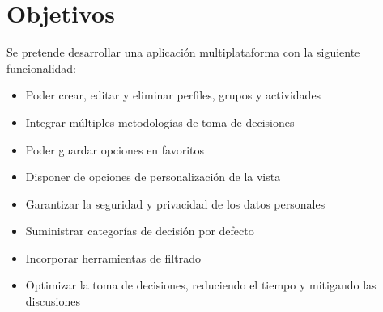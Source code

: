 \section{Objetivos}

Se pretende desarrollar una aplicación multiplataforma con la siguiente funcionalidad:

\begin{itemize}
    \item Poder crear, editar y eliminar perfiles, grupos y actividades
    \item Integrar múltiples metodologías de toma de decisiones
    \item Poder guardar opciones en favoritos
    \item Disponer de opciones de personalización de la vista
    \item Garantizar la seguridad y privacidad de los datos personales
    \item Suministrar categorías de decisión por defecto
    \item Incorporar herramientas de filtrado
    \item Optimizar la toma de decisiones, reduciendo el tiempo y mitigando las discusiones

    
\end{itemize}
